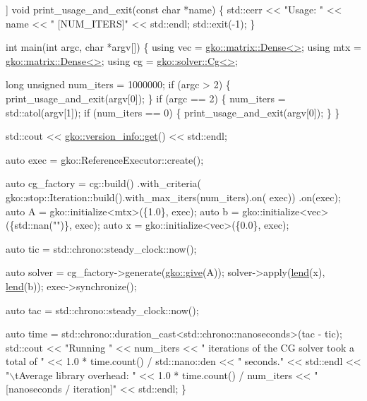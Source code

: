 \begin{DoxyCodeInclude}
[[noreturn]] \textcolor{keywordtype}{void} print\_usage\_and\_exit(\textcolor{keyword}{const} \textcolor{keywordtype}{char} *name)
\{
    std::cerr << \textcolor{stringliteral}{"Usage: "} << name << \textcolor{stringliteral}{" [NUM\_ITERS]"} << std::endl;
    std::exit(-1);
\}


\textcolor{keywordtype}{int} main(\textcolor{keywordtype}{int} argc, \textcolor{keywordtype}{char} *argv[])
\{
    \textcolor{keyword}{using} vec = \hyperlink{classgko_1_1matrix_1_1Dense}{gko::matrix::Dense<>};
    \textcolor{keyword}{using} mtx = \hyperlink{classgko_1_1matrix_1_1Dense}{gko::matrix::Dense<>};
    \textcolor{keyword}{using} cg = \hyperlink{classgko_1_1solver_1_1Cg}{gko::solver::Cg<>};

    \textcolor{keywordtype}{long} \textcolor{keywordtype}{unsigned} num\_iters = 1000000;
    \textcolor{keywordflow}{if} (argc > 2) \{
        print\_usage\_and\_exit(argv[0]);
    \}
    \textcolor{keywordflow}{if} (argc == 2) \{
        num\_iters = std::atol(argv[1]);
        \textcolor{keywordflow}{if} (num\_iters == 0) \{
            print\_usage\_and\_exit(argv[0]);
        \}
    \}

    std::cout << \hyperlink{classgko_1_1version__info_a6daeb8a087cfb57fa055526fc133d8eb}{gko::version\_info::get}() << std::endl;

    \textcolor{keyword}{auto} exec = gko::ReferenceExecutor::create();

    \textcolor{keyword}{auto} cg\_factory =
        cg::build()
            .with\_criteria(
                gko::stop::Iteration::build().with\_max\_iters(num\_iters).on(
                    exec))
            .on(exec);
    \textcolor{keyword}{auto} A = gko::initialize<mtx>(\{1.0\}, exec);
    \textcolor{keyword}{auto} b = gko::initialize<vec>(\{std::nan(\textcolor{stringliteral}{""})\}, exec);
    \textcolor{keyword}{auto} x = gko::initialize<vec>(\{0.0\}, exec);

    \textcolor{keyword}{auto} tic = std::chrono::steady\_clock::now();

    \textcolor{keyword}{auto} solver = cg\_factory->generate(\hyperlink{namespacegko_acbd3fd6d07e498892881e8e2ab0b4167}{gko::give}(A));
    solver->apply(\hyperlink{namespacegko_aa8cb4876b72e5e1036ea9575443c439b}{lend}(x), \hyperlink{namespacegko_aa8cb4876b72e5e1036ea9575443c439b}{lend}(b));
    exec->synchronize();

    \textcolor{keyword}{auto} tac = std::chrono::steady\_clock::now();

    \textcolor{keyword}{auto} time = std::chrono::duration\_cast<std::chrono::nanoseconds>(tac - tic);
    std::cout << \textcolor{stringliteral}{"Running "} << num\_iters
              << \textcolor{stringliteral}{" iterations of the CG solver took a total of "}
              << 1.0 * time.count() / std::nano::den << \textcolor{stringliteral}{" seconds."} << std::endl
              << \textcolor{stringliteral}{"\(\backslash\)tAverage library overhead:     "}
              << 1.0 * time.count() / num\_iters << \textcolor{stringliteral}{" [nanoseconds / iteration]"}
              << std::endl;
\}
\end{DoxyCodeInclude}
 